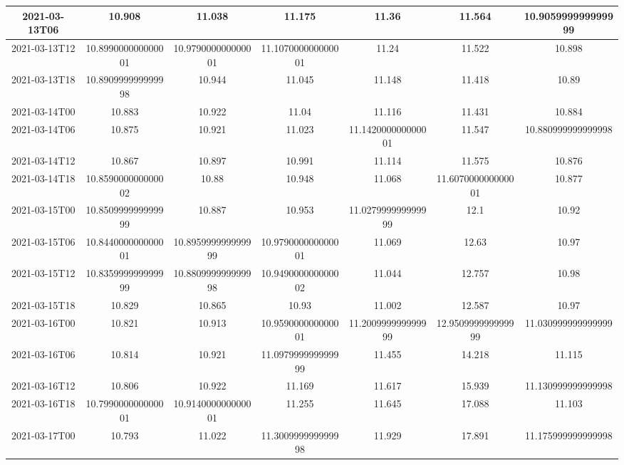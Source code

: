 \documentclass[a4paper,12pt]{article}
\begin{document}
\begin{table}[ht]
\begin{tabular}{|c|c|c|c|c|c|c|}
        \hline
        2021-03-13T06 & 10.908 & 11.038 & 11.175 & 11.36 & 11.564 & 10.905999999999999 \\
        \hline
        2021-03-13T12 & 10.899000000000001 & 10.979000000000001 & 11.107000000000001 & 11.24 & 11.522 & 10.898 \\
        \hline
        2021-03-13T18 & 10.890999999999998 & 10.944 & 11.045 & 11.148 & 11.418 & 10.89 \\
        \hline
        2021-03-14T00 & 10.883 & 10.922 & 11.04 & 11.116 & 11.431 & 10.884 \\
        \hline
        2021-03-14T06 & 10.875 & 10.921 & 11.023 & 11.142000000000001 & 11.547 & 10.880999999999998 \\
        \hline
        2021-03-14T12 & 10.867 & 10.897 & 10.991 & 11.114 & 11.575 & 10.876 \\
        \hline
        2021-03-14T18 & 10.859000000000002 & 10.88 & 10.948 & 11.068 & 11.607000000000001 & 10.877 \\
        \hline
        2021-03-15T00 & 10.850999999999999 & 10.887 & 10.953 & 11.027999999999999 & 12.1 & 10.92 \\
        \hline
        2021-03-15T06 & 10.844000000000001 & 10.895999999999999 & 10.979000000000001 & 11.069 & 12.63 & 10.97 \\
        \hline
        2021-03-15T12 & 10.835999999999999 & 10.880999999999998 & 10.949000000000002 & 11.044 & 12.757 & 10.98 \\
        \hline
        2021-03-15T18 & 10.829 & 10.865 & 10.93 & 11.002 & 12.587 & 10.97 \\
        \hline
        2021-03-16T00 & 10.821 & 10.913 & 10.959000000000001 & 11.200999999999999 & 12.950999999999999 & 11.030999999999999 \\
        \hline
        2021-03-16T06 & 10.814 & 10.921 & 11.097999999999999 & 11.455 & 14.218 & 11.115 \\
        \hline
        2021-03-16T12 & 10.806 & 10.922 & 11.169 & 11.617 & 15.939 & 11.130999999999998 \\
        \hline
        2021-03-16T18 & 10.799000000000001 & 10.914000000000001 & 11.255 & 11.645 & 17.088 & 11.103 \\
        \hline
        2021-03-17T00 & 10.793 & 11.022 & 11.300999999999998 & 11.929 & 17.891 & 11.175999999999998 \\
        \hline
    \end{tabular}
    \vspace{-12pt}
\end{table}
\end{document}
